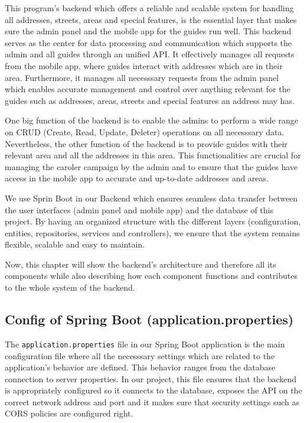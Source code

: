 \Author{\daAuthorThree}

    This program's backend which offers a reliable and scalable system for handling all addresses, streets, areas and special features, is the essential layer that makes sure the admin panel and the mobile app for the guides run well. \newline
    This backend serves as the center for data processing and communication which supports the admin and all guides through an unified API. \newline
    It effectively manages all requests from the mobile app, where guides interact with addresses which are in their area. Furthermore, it manages all necesssary requests from the admin panel which enables accurate management and control over anything relevant for the guides such as addresses, areas, streets and special features an address may has. \newline 

    One big function of the backend is to enable the admins to perform a wide range on CRUD (Create, Read, Update, Deleter) operations on all necesssary data. Nevertheless, the other function of the backend is to provide guides with their relevant area and all the addresses in this area. This functionalities are crucial for managing the caroler campaign by the admin and to ensure that the guides have access in the mobile app to accurate and up-to-date addresses and areas. \newline

    We use Sprin Boot in our Backend which ensures seamless data transfer between the user interfaces (admin panel and mobile app) and the database of this project. By having an organized structure with the different layers (configuration, entities, repositories, services and controllers), we ensure that the system remains flexible, scalable and easy to maintain. \newline 

    Now, this chapter will show the backend's architecture and therefore all its components while also describing how each component functions and contributes to the whole system of the backend.

    \subsection{Config of Spring Boot (application.properties)}
    The \texttt{application.properties} file in our Spring Boot application is the main configuration file where all the necesssary settings which are related to the application's behavior are defined. This behavior ranges from the database connection to server properties. In our project, this file ensures that the backend is appropriately configured so it connects to the database, exposes the API on the correct network address and port and it makes sure that security settings such as CORS policies are configured right.


